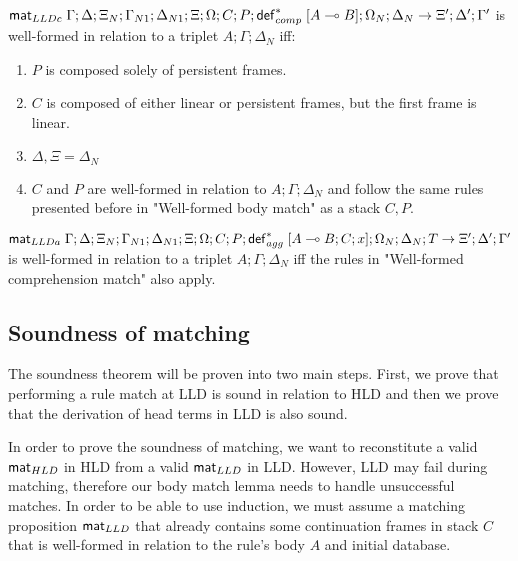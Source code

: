 \begin{definition}
\leavevmode
\newline
$\mathsf{mat}_{LLDc} \; \Gamma; \Delta; \Xi_N; \Gamma_{N1}; \Delta_{N1}; \Xi; \Omega; C; P;
\mathsf{def}_{comp}^{*} \; [A \multimap B]; \Omega_N; \Delta_N \rightarrow \Xi'; \Delta'; \Gamma'$ is
well-formed in relation to a triplet $A; \Gamma; \Delta_{N}$ iff:

\begin{enumerate}
   \item $P$ is composed solely of persistent frames.
   \item $C$ is composed of either linear or persistent frames, but the first
   frame is linear.
   \item $\Delta, \Xi = \Delta_{N}$
   \item $C$ and $P$ are well-formed in relation to $A; \Gamma; \Delta_{N}$ and
   follow the same rules presented before in "Well-formed body match" as a stack
   $C, P$.
\end{enumerate}
\end{definition}

\begin{definition}
\leavevmode
\newline
$\mathsf{mat}_{LLDa} \; \Gamma; \Delta; \Xi_N; \Gamma_{N1}; \Delta_{N1}; \Xi; \Omega; C; P;
\mathsf{def}_{agg}^{*} \; [A \multimap B ; C; x]; \Omega_N; \Delta_N; T \rightarrow \Xi'; \Delta'; \Gamma'$ is
well-formed in relation to a triplet $A; \Gamma; \Delta_{N}$ iff the rules in
"Well-formed comprehension match" also apply.

\end{definition}


\subsection{Soundness of matching}

The soundness theorem will be proven into two main steps. First, we prove that
performing a rule match at LLD is sound in relation to HLD and then we prove
that the derivation of head terms in LLD is also sound.

In order to prove the soundness of matching, we want to reconstitute a valid
$\mathsf{mat}_{HLD} \;$in HLD from a valid $\mathsf{mat}_{LLD} \;$in LLD. However, LLD may fail during matching,
therefore our body match lemma needs to handle unsuccessful matches. In order to
be able to use induction, we must assume a matching proposition $\mathsf{mat}_{LLD} \;$that
already contains some continuation frames in stack $C$ that is well-formed in
relation to the rule's body $A$ and initial database.

